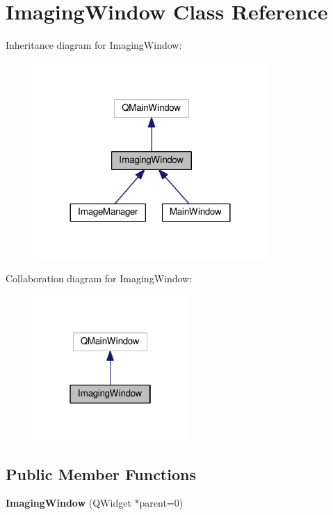 \hypertarget{classImagingWindow}{}\section{Imaging\+Window Class Reference}
\label{classImagingWindow}


Inheritance diagram for Imaging\+Window\+:\nopagebreak
\begin{figure}[H]
\begin{center}
\leavevmode
\includegraphics[width=252pt]{classImagingWindow__inherit__graph}
\end{center}
\end{figure}


Collaboration diagram for Imaging\+Window\+:\nopagebreak
\begin{figure}[H]
\begin{center}
\leavevmode
\includegraphics[width=166pt]{classImagingWindow__coll__graph}
\end{center}
\end{figure}
\subsection*{Public Member Functions}
\begin{DoxyCompactItemize}
\item 
{\bfseries Imaging\+Window} (Q\+Widget $\ast$parent=0)\hypertarget{classImagingWindow_a2732036b2630581db7921396ecf84fd5}{}\label{classImagingWindow_a2732036b2630581db7921396ecf84fd5}

\end{DoxyCompactItemize}
